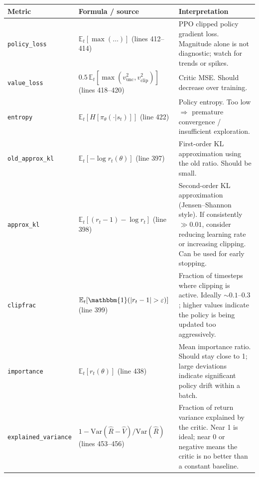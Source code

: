 \documentclass[12pt, a4paper]{article}
\theoremstyle{definition}
\theoremstyle{plain}
\theoremstyle{remark}
\newcommand{\E}{\mathbb{E}}
\begin{document}
\begin{center}
\renewcommand{\arraystretch}{1.35}
\begin{tabular}{p{3.4cm} p{5.2cm} p{5.8cm}}
  \toprule
  \textbf{Metric} & \textbf{Formula / source} & \textbf{Interpretation} \\
  \midrule
  \texttt{policy\_loss}
    & $\E_t[\max(\ldots)]$ (lines 412--414)
    & PPO clipped policy gradient loss.  Magnitude alone is not diagnostic; watch for
      trends or spikes.\\

  \texttt{value\_loss}
    & $0.5\,\E_t[\max(v^2_\mathrm{unc}, v^2_\mathrm{clip})]$ (lines 418--420)
    & Critic MSE.  Should decrease over training. \\

  \texttt{entropy}
    & $\E_t[H[\pi_\theta(\cdot|s_t)]]$ (line 422)
    & Policy entropy.  Too low $\Rightarrow$ premature convergence / insufficient
      exploration. \\

  \texttt{old\_approx\_kl}
    & $\E_t[-\log r_t(\theta)]$ (line 397)
    & First-order KL approximation using the old ratio.  Should be small. \\

  \texttt{approx\_kl}
    & $\E_t[(r_t - 1) - \log r_t]$ (line 398)
    & Second-order KL approximation (Jensen--Shannon style).  If consistently $\gg 0.01$,
      consider reducing learning rate or increasing clipping.  Can be used for early
      stopping. \\

  \texttt{clipfrac}
    & $\E_t[\mathbbm{1}(|r_t - 1| > \varepsilon)]$ (line 399)
    & Fraction of timesteps where clipping is active.  Ideally $\sim 0.1$--$0.3$;
      higher values indicate the policy is being updated too aggressively. \\

  \texttt{importance}
    & $\E_t[r_t(\theta)]$ (line 438)
    & Mean importance ratio.  Should stay close to 1; large deviations indicate
      significant policy drift within a batch. \\

  \texttt{explained\_variance}
    & $1 - \mathrm{Var}(\hat{R} - \hat{V})/\mathrm{Var}(\hat{R})$ (lines 453--456)
    & Fraction of return variance explained by the critic.  Near 1 is ideal; near 0 or
      negative means the critic is no better than a constant baseline. \\
  \bottomrule
\end{tabular}
\end{center}
\end{document}
